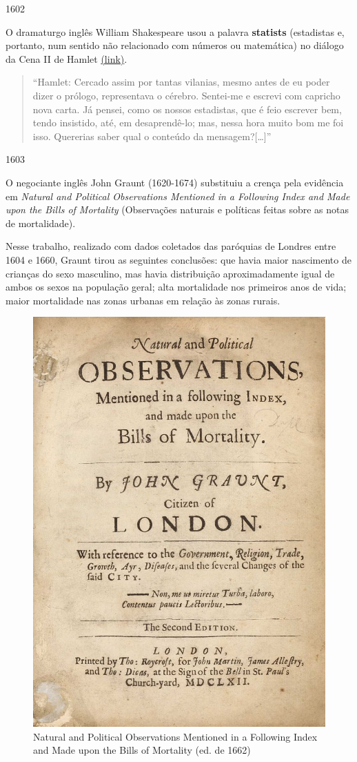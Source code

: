 \documentclass[
]{book}
\theoremstyle{definition}
\theoremstyle{definition}
\theoremstyle{definition}
\theoremstyle{definition}
\theoremstyle{remark}
\begin{document}
1602

O dramaturgo inglês William Shakespeare usou a palavra \textbf{statists} (estadistas e, portanto, num sentido não relacionado com números ou matemática) no diálogo da Cena II de Hamlet \href{http://shakespeare.mit.edu/hamlet/full.html}{(link)}.

\begin{quote}
``Hamlet:
Cercado assim por tantas vilanias, mesmo antes de eu poder dizer o prólogo, representava o cérebro.
Sentei-me e escrevi com capricho nova carta. Já pensei, como os nossos estadistas, que é feio escrever bem, tendo insistido, até, em desaprendê-lo; mas, nessa hora muito bom me foi isso. Quererias saber
qual o conteúdo da mensagem?{[}\ldots{]}''
\end{quote}

1603

O negociante inglês John Graunt (1620-1674) substituiu a crença pela evidência em \emph{Natural and Political Observations Mentioned in a Following Index and Made upon the Bills of Mortality} (Observações naturais e políticas feitas sobre as notas de mortalidade).

Nesse trabalho, realizado com dados coletados das paróquias de Londres entre 1604 e 1660, Graunt tirou as seguintes conclusões: que havia maior nascimento de crianças do sexo masculino, mas havia distribuição aproximadamente igual de ambos os sexos na população geral; alta mortalidade nos primeiros anos de vida; maior mortalidade nas zonas urbanas em relação às zonas rurais.

\begin{figure}

{\centering \includegraphics[width=0.5\linewidth]{images/graunt} 

}

\caption{Natural and Political Observations Mentioned in a Following Index and Made upon the Bills of Mortality (ed. de 1662)}\label{fig:unnamed-chunk-3}
\end{figure}
\end{document}
